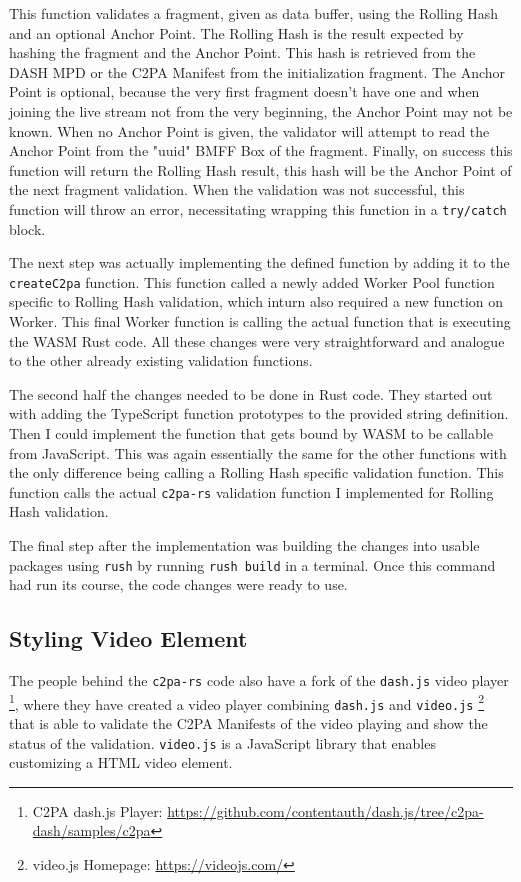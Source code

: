 This function validates a fragment, given as data buffer, using the Rolling Hash and an optional Anchor Point. The Rolling Hash is the result expected by hashing the fragment and the Anchor Point. This hash is retrieved from the DASH MPD or the C2PA Manifest from the initialization fragment. The Anchor Point is optional, because the very first fragment doesn't have one and when joining the live stream not from the very beginning, the Anchor Point may not be known. When no Anchor Point is given, the validator will attempt to read the Anchor Point from the "uuid" BMFF Box of the fragment. Finally, on success this function will return the Rolling Hash result, this hash will be the Anchor Point of the next fragment validation. When the validation was not successful, this function will throw an error, necessitating wrapping this function in a \texttt{try/catch} block.

The next step was actually implementing the defined function by adding it to the \texttt{createC2pa} function. This function called a newly added Worker Pool function specific to Rolling Hash validation, which inturn also required a new function on Worker. This final Worker function is calling the actual function that is executing the WASM Rust code. All these changes were very straightforward and analogue to the other already existing validation functions.

The second half the changes needed to be done in Rust code. They started out with adding the TypeScript function prototypes to the provided string definition. Then I could implement the function that gets bound by WASM to be callable from JavaScript. This was again essentially the same for the other functions with the only difference being calling a Rolling Hash specific validation function. This function calls the actual \texttt{c2pa-rs} validation function I implemented for Rolling Hash validation.

The final step after the implementation was building the changes into usable packages using \texttt{rush} by running \texttt{rush build} in a terminal. Once this command had run its course, the code changes were ready to use.

\subsection{Styling Video Element}

The people behind the \texttt{c2pa-rs} code also have a fork of the \texttt{dash.js} video player \footnote{C2PA dash.js Player: \url{https://github.com/contentauth/dash.js/tree/c2pa-dash/samples/c2pa}}, where they have created a video player combining \texttt{dash.js} and \texttt{video.js} \footnote{video.js Homepage: \url{https://videojs.com/}} that is able to validate the C2PA Manifests of the video playing and show the status of the validation. \texttt{video.js} is a JavaScript library that enables customizing a HTML video element.

